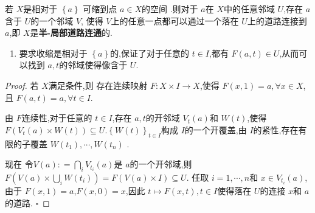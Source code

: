 \documentclass[../../几何与拓扑.tex]{subfiles}
\begin{document}
\begin{theorem}
    若 \(  X  \)是相对于 \(  \left\{ a \right\}  \) 可缩到点 \(  a \in X  \)的空间 .则对于 \(  a  \)在 \(  X  \)中的任意邻域 \(  U  \),存在 \(  a  \)含于 \(  U  \)的一个邻域 \(  V  \),
    使得 \(  V  \)上的任意一点都可以通过一个落在 \(  U  \)上的道路连接到 \(  a  \),即 \(  X  \)是\textbf{半-局部道路连通}的.           
\end{theorem}

\begin{note}

    \begin{enumerate}
        \item 要求收缩是相对于 \(  \left\{ a \right\}  \)的,保证了对于任意的 \(  t \in I  \),都有 \(  F\left( a,t \right) \in U   \),从而可以找到 \(  a,t  \)的邻域使得像含于 \(  U  \).     
    \end{enumerate}
    

\end{note}
\begin{proof}

    若 \(  X  \)满足条件,则 存在连续映射 \(  F: X\times I\to  X  \),使得 \(  F\left( x,1 \right)= a,\forall  x \in X   \),且 \(  F\left( a,t \right)= a, \forall  t \in I   \).
    
   由 \(  F  \)连续性,对于任意的 \(  t \in I  \),存在 \(  a,t  \)的开邻域 \(  V_{t}\left( a \right)   \)和 \(  W\left( t \right)   \),使得 \(  F\left( V_{t}\left( a \right)\times W\left( t \right)   \right)\subseteq U   \).\(  \left\{ W\left( t \right)  \right\}_{t \in I}  \)构成 \(  I  \)的一个开覆盖,由 \(  I  \)的紧性,存在有限的子覆盖
    \(  W\left( t_1 \right),\cdots ,W\left( t_{n} \right)    \)         .

    现在 令\(V\left( a \right): =     \bigcap_{i}V_{t_{i}}  \left( a \right)  \)是 \(  a  \)的一个开邻域,则 \(  F\left( V\left( a \right) \times  \bigcup_{i} W\left( t_{i} \right)   \right)  =  F\left( V\left( a \right)\times I  \right) \subseteq U   \).
    任取  \(  i =   1,\cdots,n   \)和 \(  x \in  V_{t_{i}}\left( a \right)   \),         
    由于 \(  F\left( x,1 \right)= a   \),\(  F\left( x,0 \right)= x   \),因此 \(  t\mapsto F\left( x,t \right), t \in I   \)使得落在 \(  U  \)的连接 \(  x  \)和 \(  a  \)的道路.     
    \hfill $\square$
\end{proof}
\end{document}
